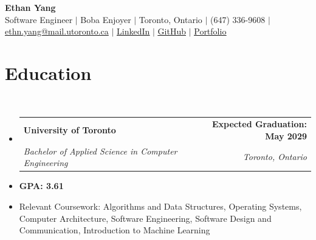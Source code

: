 \documentclass[letterpaper,10pt]{article}
\makeatletter
\newcommand{\resumeItem}[1]{
  \item\small{
    {#1 \vspace{0pt}}
  }
}
\newcommand{\resumeSubheading}[4]{
  \vspace{-2pt}\item
    \begin{tabular*}{1.0\textwidth}[t]{l@{\extracolsep{\fill}}r}
      \textbf{#1} & \textbf{\small #2} \\
      \textit{\small#3} & \textit{\small #4} \\
    \end{tabular*}\vspace{-7pt}
}
\newcommand{\resumeSubHeadingListStart}{\begin{itemize}[leftmargin=0.0in, label={}]}
\newcommand{\resumeSubHeadingListEnd}{\end{itemize}}\vspace{0pt}
\newcommand{\resumeItemListStart}{\begin{itemize}}
\newcommand{\resumeItemListEnd}{\end{itemize}\vspace{-5pt}}
\makeatother
\begin{document}
\fontsize{10pt}{12pt}\selectfont

\begin{center}
    {\LARGE \textbf{Ethan Yang}} \\[2mm]
    \footnotesize \raisebox{-0.1\height}
    Software Engineer $|$ Boba Enjoyer $|$ Toronto, Ontario $|$
    (647) 336-9608 $|$
    \textcolor{linkblue}{\underline{ethn.yang@mail.utoronto.ca}} $|$
    \textcolor{linkblue}{\underline{\href{https://www.linkedin.com/in/ey6/}{LinkedIn}}} $|$
    \textcolor{linkblue}{\underline{\href{https://github.com/e-yang6}{GitHub}}} $|$
    \textcolor{linkblue}{\underline{\href{https://ethanyang.dev/}{Portfolio}}}
    \vspace{-8pt}
\end{center}

\section{Education} \\[1mm]
  \resumeSubHeadingListStart
  \resumeSubheading
  {University of Toronto}{Expected Graduation: May 2029}
  {Bachelor of Applied Science in Computer Engineering
  }{Toronto, Ontario}
\resumeSubHeadingListEnd
  \resumeItemListStart
  \resumeItem {\textbf{GPA: 3.61}}
        \vspace{-7pt}
      \resumeItem {Relevant Coursework: Algorithms and Data Structures, Operating Systems, Computer Architecture, Software Engineering, Software Design and Communication, Introduction to Machine Learning}
  \resumeItemListEnd
    \vspace{-12pt}

\end{document}
